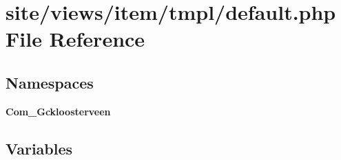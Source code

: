 \section{site/views/item/tmpl/default.php File Reference}
\label{site_2views_2item_2tmpl_2default_8php}
\subsection*{Namespaces}
\begin{DoxyCompactItemize}
\item 
 \textbf{ Com\+\_\+\+Gckloosterveen}
\end{DoxyCompactItemize}
\subsection*{Variables}
